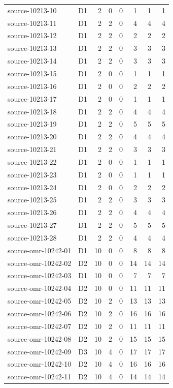 \begin{longtable}{llrrrrrr}
source-10213-10 & D1 & 2 & 0 & 0 & 1 & 1 & 1\\
source-10213-11 & D1 & 2 & 2 & 0 & 4 & 4 & 4\\
source-10213-12 & D1 & 2 & 2 & 0 & 2 & 2 & 2\\
source-10213-13 & D1 & 2 & 2 & 0 & 3 & 3 & 3\\
source-10213-14 & D1 & 2 & 2 & 0 & 3 & 3 & 3\\
source-10213-15 & D1 & 2 & 0 & 0 & 1 & 1 & 1\\
source-10213-16 & D1 & 2 & 0 & 0 & 2 & 2 & 2\\
source-10213-17 & D1 & 2 & 0 & 0 & 1 & 1 & 1\\
source-10213-18 & D1 & 2 & 2 & 0 & 4 & 4 & 4\\
source-10213-19 & D1 & 2 & 2 & 0 & 5 & 5 & 5\\
source-10213-20 & D1 & 2 & 2 & 0 & 4 & 4 & 4\\
source-10213-21 & D1 & 2 & 2 & 0 & 3 & 3 & 3\\
source-10213-22 & D1 & 2 & 0 & 0 & 1 & 1 & 1\\
source-10213-23 & D1 & 2 & 0 & 0 & 1 & 1 & 1\\
source-10213-24 & D1 & 2 & 0 & 0 & 2 & 2 & 2\\
source-10213-25 & D1 & 2 & 2 & 0 & 3 & 3 & 3\\
source-10213-26 & D1 & 2 & 2 & 0 & 4 & 4 & 4\\
source-10213-27 & D1 & 2 & 2 & 0 & 5 & 5 & 5\\
source-10213-28 & D1 & 2 & 2 & 0 & 4 & 4 & 4\\
source-omr-10242-01 & D1 & 10 & 0 & 0 & 8 & 8 & 8\\
source-omr-10242-02 & D2 & 10 & 0 & 0 & 14 & 14 & 14\\
source-omr-10242-03 & D1 & 10 & 0 & 0 & 7 & 7 & 7\\
source-omr-10242-04 & D2 & 10 & 0 & 0 & 11 & 11 & 11\\
source-omr-10242-05 & D2 & 10 & 2 & 0 & 13 & 13 & 13\\
source-omr-10242-06 & D2 & 10 & 2 & 0 & 16 & 16 & 16\\
source-omr-10242-07 & D2 & 10 & 2 & 0 & 11 & 11 & 11\\
source-omr-10242-08 & D2 & 10 & 2 & 0 & 15 & 15 & 15\\
source-omr-10242-09 & D3 & 10 & 4 & 0 & 17 & 17 & 17\\
source-omr-10242-10 & D2 & 10 & 4 & 0 & 16 & 16 & 16\\
source-omr-10242-11 & D2 & 10 & 4 & 0 & 14 & 14 & 14\\

\end{longtable}
